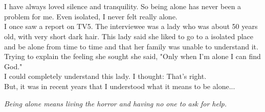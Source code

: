 \documentclass[11pt]{book}
\title{\textbf{Ana} \\ \vskip 1em \small The policy of silencing}
\author{Tatiana Balbi Fraga}
\date{}
\begin{document}
\maketitle
\thispagestyle{empty}

\chapter{}

I have always loved silence and tranquility. So being alone has never been a problem for me. Even isolated, I never felt really alone. \\

\noindent I once saw a report on TV5. The interviewee was a lady who was about 50 years old, with very short dark hair. This lady said she liked to go to a isolated place and be alone from time to time and that her family was unable to understand it. Trying to explain the feeling she sought she said, "Only when I'm alone I can find God." \\

\noindent I could completely understand this lady. I thought: That's right. \\

\noindent But, it was in recent years that I understood what it means to be alone... \\

\noindent \begin{center} \emph{Being alone means living the horror and having no one to ask for help.} \end{center}
\end{document}
